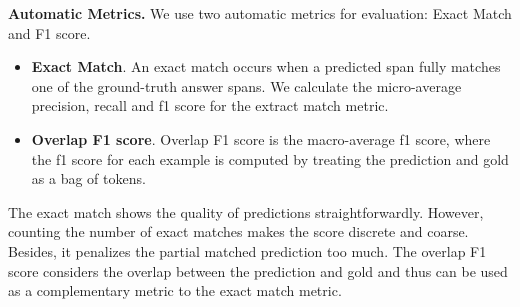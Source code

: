 \documentclass[a4paper]{cas-sc}
\newcommand{\1}[1]{\mathds{1}\left[#1\right]}
\begin{document}
\textbf{Automatic Metrics.}  We use two automatic metrics for evaluation: Exact Match and F1 score. 
\begin{itemize}
	\item \textbf{Exact Match}. An exact match occurs when a predicted span fully matches one of the ground-truth answer spans. We calculate the micro-average precision, recall and f1 score for the extract match metric. 
	\item \textbf{Overlap F1 score}. Overlap F1 score is the macro-average f1 score, where the f1 score for each example is computed by treating the prediction and gold as a bag of tokens.
\end{itemize}
The exact match shows the quality of predictions straightforwardly. However, counting the number of exact matches makes the score discrete and coarse. Besides, it penalizes the partial matched prediction too much. The overlap F1 score considers the overlap between the prediction and gold and thus can be used as a complementary metric to the exact match metric.
%
\end{document}

